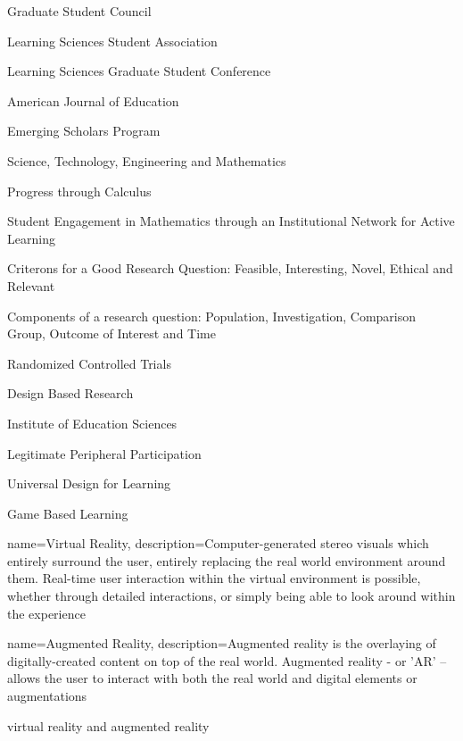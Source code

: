 {Graduate Student Council}

{Learning Sciences Student Association}

{Learning Sciences Graduate Student Conference}

{American Journal of Education}

{Emerging Scholars Program}

{Science, Technology, Engineering and Mathematics}

{Progress through Calculus}

{Student Engagement in Mathematics through an Institutional Network for Active Learning}

{Criterons for a Good Research Question: Feasible, Interesting, Novel, Ethical and Relevant}

{Components of a research question: Population, Investigation, Comparison Group, Outcome of Interest and Time}

{Randomized Controlled Trials}

{Design Based Research}

{Institute of Education Sciences}

{Legitimate Peripheral Participation}

{Universal Design for Learning} 

{Game Based Learning}

{
	name={Virtual Reality},
	description={Computer-generated stereo visuals which entirely surround the user, entirely replacing the real world environment around them. Real-time user interaction within the virtual environment is possible, whether through detailed interactions, or simply being able to look around within the experience \parencite{noauthor_what_2019} }
}

{
	name={Augmented Reality},
	description={Augmented reality is the overlaying of digitally-created content on top of the real world. Augmented reality - or 'AR' – allows the user to interact with both the real world and digital elements or augmentations \parencite{noauthor_what_2019} }
}

{\gls{virtual reality} and \gls{augmented reality}}


